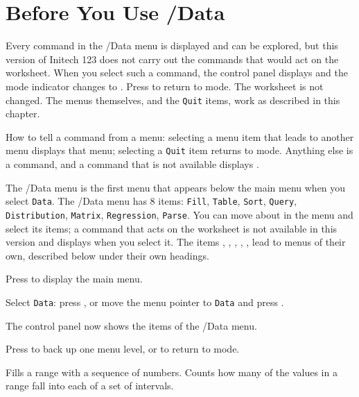\section{Before You Use /Data}
\begin{Note}
Every command in the /Data menu is displayed and can be explored, but this
version of Initech 123 does not carry out the commands that would act on the
worksheet.  When you select such a command, the control panel displays
 and the mode indicator changes to
.  Press  to return to  mode.  The worksheet
is not changed.  The menus themselves, and the \texttt{Quit} items, work as
described in this chapter.
\end{Note}
How to tell a command from a menu: selecting a menu item that leads to another
menu displays that menu; selecting a \texttt{Quit} item returns to
 mode.  Anything else is a command, and a command that is not
available displays .

The /Data menu is the first menu that appears below the main menu when you select \texttt{Data}. The /Data menu has 8 items: \texttt{Fill}, \texttt{Table}, \texttt{Sort}, \texttt{Query}, \texttt{Distribution}, \texttt{Matrix}, \texttt{Regression}, \texttt{Parse}.  You can move about in the menu and select its items; a command that acts on the worksheet is not available in this version and displays  when you select it.
The items , , , , ,  lead to menus of their own, described below under their own headings.
\begin{Steps123}
\item Press  to display the main menu.
\item Select \texttt{Data}: press , or move the menu pointer to \texttt{Data} and press .
\item The control panel now shows the items of the /Data menu.
\item Press  to back up one menu level, or  to return to  mode.
\end{Steps123}
\begin{Options}
 Fills a range with a sequence of numbers.
 Counts how many of the values in a range fall into each of a set of intervals.
\end{Options}

